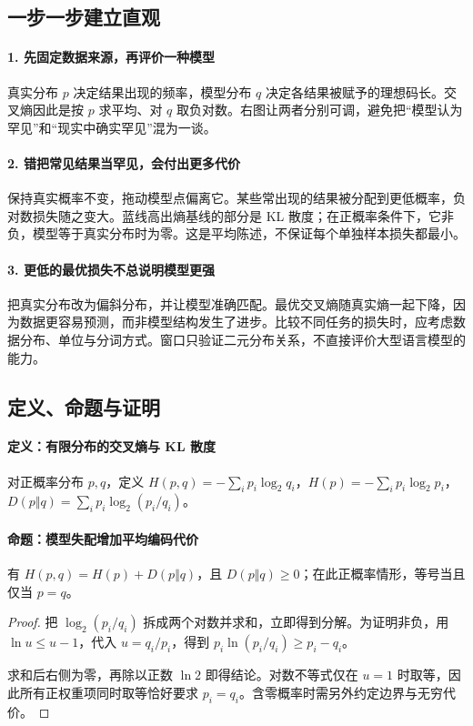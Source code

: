 \subsection*{一步一步建立直观}

\paragraph{1. 先固定数据来源，再评价一种模型}

真实分布 $p$ 决定结果出现的频率，模型分布 $q$ 决定各结果被赋予的理想码长。交叉熵因此是按 $p$ 求平均、对 $q$ 取负对数。右图让两者分别可调，避免把“模型认为罕见”和“现实中确实罕见”混为一谈。



\paragraph{2. 错把常见结果当罕见，会付出更多代价}

保持真实概率不变，拖动模型点偏离它。某些常出现的结果被分配到更低概率，负对数损失随之变大。蓝线高出熵基线的部分是 KL 散度；在正概率条件下，它非负，模型等于真实分布时为零。这是平均陈述，不保证每个单独样本损失都最小。



\paragraph{3. 更低的最优损失不总说明模型更强}

把真实分布改为偏斜分布，并让模型准确匹配。最优交叉熵随真实熵一起下降，因为数据更容易预测，而非模型结构发生了进步。比较不同任务的损失时，应考虑数据分布、单位与分词方式。窗口只验证二元分布关系，不直接评价大型语言模型的能力。



\subsection*{定义、命题与证明}

\paragraph{定义：有限分布的交叉熵与 KL 散度}

对正概率分布 $p,q$，定义 $H(p,q)=-\sum_i p_i\log_2q_i$，$H(p)=-\sum_i p_i\log_2p_i$，$D(p\Vert q)=\sum_i p_i\log_2(p_i/q_i)$。

\paragraph{命题：模型失配增加平均编码代价}

有 $H(p,q)=H(p)+D(p\Vert q)$，且 $D(p\Vert q)\ge0$；在此正概率情形，等号当且仅当 $p=q$。

\begin{proof}

把 $\log_2(p_i/q_i)$ 拆成两个对数并求和，立即得到分解。为证明非负，用 $\ln u\le u-1$，代入 $u=q_i/p_i$，得到 $p_i\ln(p_i/q_i)\ge p_i-q_i$。

求和后右侧为零，再除以正数 $\ln2$ 即得结论。对数不等式仅在 $u=1$ 时取等，因此所有正权重项同时取等恰好要求 $p_i=q_i$。含零概率时需另外约定边界与无穷代价。

\end{proof}
